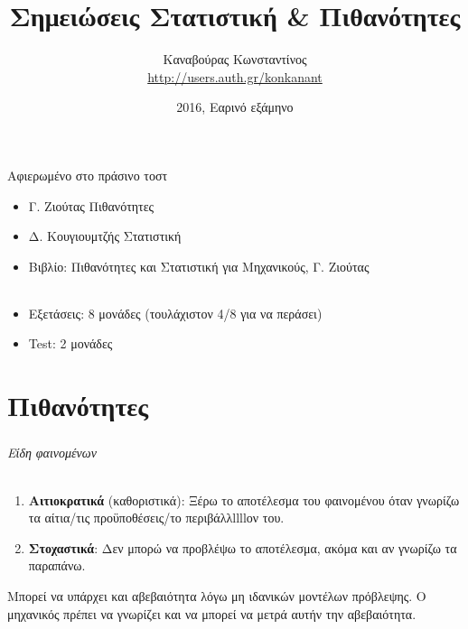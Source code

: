 \documentclass[11pt,a4paper,titlepage,draft]{article}
\title{Σημειώσεις Στατιστική \& Πιθανότητες}
\date{2016, Εαρινό εξάμηνο}
\author{Καναβούρας Κωνσταντίνος \\ \textlatin{\url{http://users.auth.gr/konkanant}}}
\newenvironment{dedication}
{\clearpage           %
	\thispagestyle{empty}%
	\vspace*{\stretch{1}}%
	\itshape             %
	\raggedleft          %
}
{\par %
	\vspace{\stretch{3}} %
	\clearpage           %
}
\begin{document}
\maketitle

\begin{dedication}
	Αφιερωμένο στο πράσινο τοστ
\end{dedication}


\newpage

\begin{itemize}
\item Γ. Ζιούτας Πιθανότητες
\item Δ. Κουγιουμτζής Στατιστική
\item Βιβλίο: Πιθανότητες και Στατιστική για Μηχανικούς, Γ. Ζιούτας
\end{itemize}

\paragraph{}

\begin{itemize}
\item Εξετάσεις: 8 μονάδες (τουλάχιστον 4/8 για να περάσει)
\item \textlatin{Test}: 2 μονάδες
\end{itemize}

\part{Πιθανότητες}

\section{}
\paragraph{Είδη φαινομένων}

\begin{enumerate}
\item \textbf{Αιτιοκρατικά} (καθοριστικά): Ξέρω το αποτέλεσμα του φαινομένου όταν γνωρίζω τα αίτια/τις προϋποθέσεις/το περιβάλλllllον του.
\item \textbf{Στοχαστικά}: Δεν μπορώ να προβλέψω το αποτέλεσμα, ακόμα και αν γνωρίζω τα παραπάνω.
\end{enumerate}
Μπορεί να υπάρχει και αβεβαιότητα λόγω μη ιδανικών μοντέλων πρόβλεψης. Ο μηχανικός πρέπει να γνωρίζει και να μπορεί να μετρά αυτήν την αβεβαιότητα.
\end{document}
